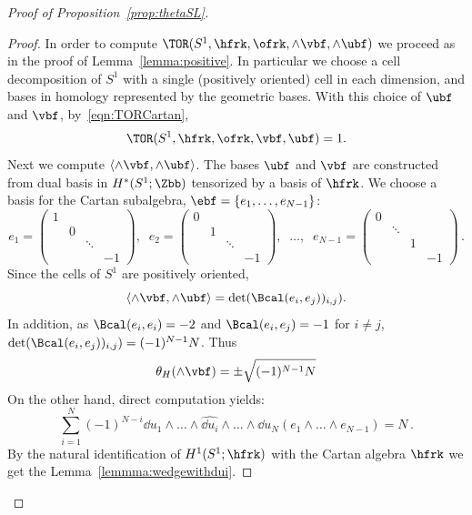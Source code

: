 \begin{proof}[Proof of Proposition~\ref{prop:thetaSL}]
\begin{proof}
In order to compute $\TOR(S^1,\hfrk,\ofrk,\wedge\vbf,\wedge\ubf)$ we proceed as in the proof of Lemma~\ref{lemma:positive}. In particular we choose a cell decomposition of $S^1$ with a single (positively oriented) cell in each dimension, and bases in homology represented by the geometric bases. With this choice of $\ubf$ and $\vbf$, by~\eqref{eqn:TORCartan},
\[
\TOR(S^1,\hfrk, \ofrk, \vbf,\ubf)=1.
\]
Next we compute $ \langle \wedge\vbf,\wedge\ubf\rangle $. The bases $\ubf$ and $\vbf$ are constructed from dual basis in $H^*(S^1;\Zbb)$ tensorized by a basis of $\hfrk$. We choose a basis for the Cartan subalgebra, $\ebf=\{e_1,\dots, e_{N-1}\}$:
\[
e_1=
\begin{pmatrix}
1 & & & \\
& 0 & & \\
& & \ddots & \\
& & & - 1
\end{pmatrix},\;\; e_2=
\begin{pmatrix}
0 & & & \\
& 1 & & \\
& & \ddots & \\
& & & - 1
\end{pmatrix},\;\;\dots,\;\; e_{N-1}=
\begin{pmatrix}
0 & & & \\
& \ddots & & \\
& & 1 & \\
& & & - 1
\end{pmatrix} \,.
\]
Since the cells of $S^1$ are positively oriented,
\[
\langle \wedge \vbf, \wedge\ubf\rangle= \det(\Bcal(e_i,e_j))_{i,j}).
\]
In addition, as $\Bcal(e_i,e_i)=-2$ and $\Bcal(e_i,e_j)= -1$ for $i\neq j$, $\det(\Bcal(e_i,e_j))_{i,j}) = (-1)^{N-1} N $. Thus
\begin{equation}\label{eqn:omegahv}
\theta_H(\wedge \vbf)= \pm \sqrt{ (-1)^{N-1} N }
\end{equation}
On the other hand, direct computation yields:
\[
\sum_{i=1}^N (-1)^{N-i}\dd u_1\wedge\dots\wedge \widehat{\dd u_i}\wedge \dots\wedge \dd u_N (e_1\wedge\dots\wedge e_{N-1})=N\,.
\]
By the natural identification of $H^1(S^1;\hfrk)$ with the Cartan algebra $\hfrk$ we get the Lemma~\ref{lemmma:wedgewithdui}.
\end{proof}


\end{proof}
